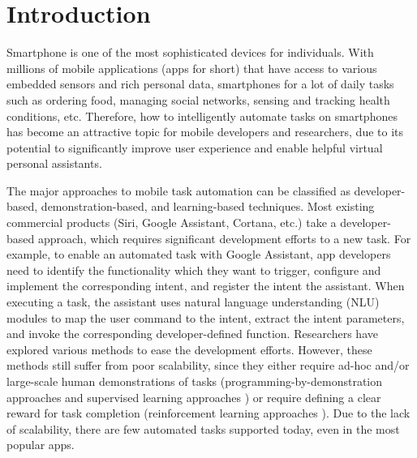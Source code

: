 

\maketitle

\section{Introduction}

Smartphone is one of the most sophisticated devices for individuals. With millions of mobile applications (apps for short) that have access to various embedded sensors and rich personal data, smartphones  for a lot of daily tasks such as ordering food, managing social networks, sensing and tracking health conditions, etc. 
Therefore, how to intelligently automate tasks on smartphones has become an attractive topic for mobile developers and researchers, due to its potential to significantly improve user experience and enable helpful virtual personal assistants.

The major approaches to mobile task automation can be classified as developer-based, demonstration-based, and learning-based techniques.
Most existing commercial products (\eg Siri, Google Assistant, Cortana, etc.) take a developer-based approach, which requires significant development efforts to  a new task.
For example, to enable an automated task with Google Assistant,
app developers need to identify the functionality which they want to trigger, configure and implement the corresponding intent, and register the intent  the assistant. When executing a task, the assistant uses natural language understanding (NLU) modules to map the user command to the intent, extract the intent parameters, and invoke the corresponding developer-defined function.
Researchers have explored various methods to ease the development efforts. However, these methods still suffer from poor scalability, since they either require ad-hoc and/or large-scale human demonstrations of tasks (\eg programming-by-demonstration approaches \cite{kite, ulink,li2017programming_iot} and supervised learning approaches \cite{seq2act, metagui, motif}) or require defining a clear reward for task completion (\eg reinforcement learning approaches \cite{ToyamaEtAl2021AndroidEnv, rl_use_computer, glider}).
Due to the lack of scalability, there are few automated tasks supported today, even in the most popular apps.

